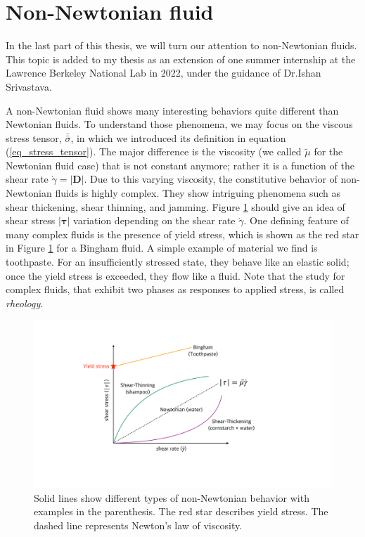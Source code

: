 \section{Non-Newtonian fluid}
\label{sec:intro_complex_fluid}
In the last part of this thesis, we will turn our attention to non-Newtonian fluids. This topic is added to my thesis as an extension of one summer internship at the Lawrence Berkeley National Lab in 2022, under the guidance of Dr.Ishan Srivastava. 
\par
\vphantom{text}
\par
A non-Newtonian fluid shows many interesting behaviors quite different than Newtonian fluids. To understand those phenomena, we may focus on the viscous stress tensor, $\bar{\bar{\sigma}}$, in which we introduced its definition in equation (\ref{eq_stress_tensor}). The major difference is the viscosity (we called $\tilde{\mu}$ for the Newtonian fluid case) that is not constant anymore; rather it is a function of the shear rate $\dot{\gamma} = \left| {\boldsymbol{D}} \right|$.
Due to this varying viscosity, the constitutive behavior of non-Newtonian fluids is highly complex. 
They show intriguing phenomena such as shear thickening, shear thinning, and jamming. Figure \ref{fig_rheology} should give an idea of shear stress $|\bm{\tau}|$ variation depending on the shear rate $\dot{\gamma}$. 
One defining feature of many complex fluids is the presence of yield stress, which is shown as the red star in Figure \ref{fig_rheology} for a Bingham fluid. A simple example of material we find is toothpaste. For an insufficiently stressed state, they behave like an elastic solid; once the yield stress is exceeded, they flow like a fluid. Note that the study for complex fluids, that exhibit two phases as responses to applied stress, is called {\textit{rheology}}. 
\begin{figure}[h]
	\begin{center}
		\includegraphics[scale=0.25]{figures/fig_yield_stress_graph.pdf}
	\end{center}
   \caption{Solid lines show different types of non-Newtonian behavior with examples in the parenthesis. The red star describes yield stress. The dashed line represents Newton's law of viscosity.}
\label{fig_rheology}
\end{figure}
